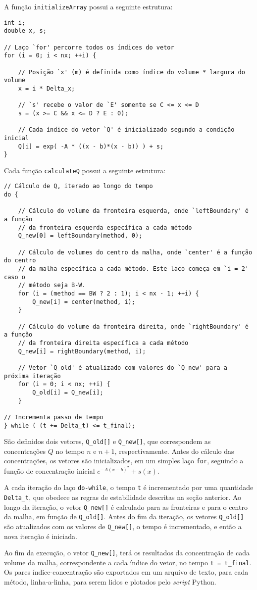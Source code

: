 \noindent A função \verb|initializeArray| possui a seguinte estrutura:
\begin{Verbatim}[fontsize=\footnotesize]
int i;
double x, s;

// Laço `for' percorre todos os índices do vetor
for (i = 0; i < nx; ++i) {

    // Posição `x' (m) é definida como índice do volume * largura do volume
    x = i * Delta_x;

    // `s' recebe o valor de `E' somente se C <= x <= D
    s = (x >= C && x <= D ? E : 0);

    // Cada índice do vetor `Q' é inicializado segundo a condição inicial
    Q[i] = exp( -A * ((x - b)*(x - b)) ) + s;
}
\end{Verbatim}

\noindent Cada função \verb|calculateQ| possui a seguinte estrutura:

\begin{Verbatim}[fontsize=\footnotesize]
// Cálculo de Q, iterado ao longo do tempo
do {

    // Cálculo do volume da fronteira esquerda, onde `leftBoundary' é a função
    // da fronteira esquerda específica a cada método
    Q_new[0] = leftBoundary(method, 0);

    // Cálculo de volumes do centro da malha, onde `center' é a função do centro
    // da malha específica a cada método. Este laço começa em `i = 2' caso o
    // método seja B-W.
    for (i = (method == BW ? 2 : 1); i < nx - 1; ++i) {
        Q_new[i] = center(method, i);
    }

    // Cálculo do volume da fronteira direita, onde `rightBoundary' é a função
    // da fronteira direita específica a cada método
    Q_new[i] = rightBoundary(method, i);

    // Vetor `Q_old' é atualizado com valores do `Q_new' para a próxima iteração
    for (i = 0; i < nx; ++i) {
        Q_old[i] = Q_new[i];
    }

// Incrementa passo de tempo
} while ( (t += Delta_t) <= t_final);
\end{Verbatim}

São definidos dois vetores, \verb|Q_old[]| e \verb|Q_new[]|, que correspondem as
concentrações $Q$ no tempo $n$ e $n+1$, respectivamente. Antes do cálculo das
concentrações, os vetores são inicializados, em um simples laço \verb|for|,
seguindo a função de concentração inicial $e^{-A(x-b)^2} + s(x)$.

A cada iteração do laço \verb|do-while|, o tempo \verb|t| é incrementado por uma
quantidade \verb|Delta_t|, que obedece as regras de estabilidade descritas na
seção anterior. Ao longo da iteração, o vetor \verb|Q_new[]| é calculado para as
fronteiras e para o centro da malha, em função de \verb|Q_old[]|. Antes do fim
da iteração, os vetores \verb|Q_old[]| são atualizados com os valores de
\verb|Q_new[]|, o tempo é incrementado, e então a nova iteração é iniciada.

Ao fim da execução, o vetor \verb|Q_new[]|, terá os resultados da concentração
de cada volume da malha, correspondente a cada índice do vetor, no tempo
\verb|t = t_final|. Os pares índice-concentração são exportados em um arquivo
de texto, para cada método, linha-a-linha, para serem lidos e plotados pelo
\textit{script} Python.
